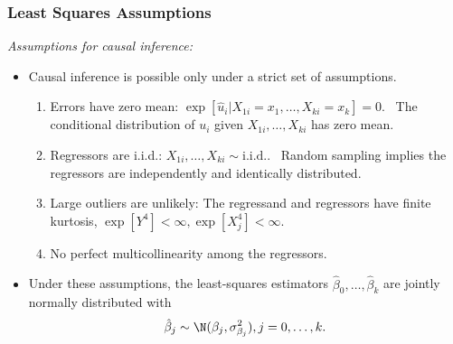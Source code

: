 

\begin{frame}
\frametitle{Least Squares Assumptions}
\emph{Assumptions for causal inference:}
\begin{itemize}
\item Causal inference is possible only under a strict set of assumptions.
\begin{enumerate}
\item Errors have zero mean: $\exp[\hat{u}_{i}| X_{1i}=x_{1},\ldots,X_{ki}=x_{k}]=0$. \,
The conditional distribution of $u_{i}$ given $X_{1i},\ldots,X_{ki}$ has zero mean.
\item Regressors are i.i.d.: $X_{1i},\ldots,X_{ki} \sim \text{i.i.d.}$. \, Random sampling implies the regressors are independently and identically distributed.
\item Large outliers are unlikely: The regressand and regressors have finite kurtosis, $\exp[Y^{4}]<\infty, \exp[X_{j}^{4}]<\infty$.
\item No perfect multicollinearity among the regressors. 
\end{enumerate}
\item Under these assumptions, the least-squares estimators $\hat{\beta}_{0},\ldots,\hat{\beta}_{k}$ are jointly normally distributed with
\begin{align*}
\hat{\beta}_{j} \sim \N(\beta_{j}, \sigma_{\beta_{j}}^{2}), j=0,\ldots,k.
\end{align*}
\end{itemize}
\end{frame}
